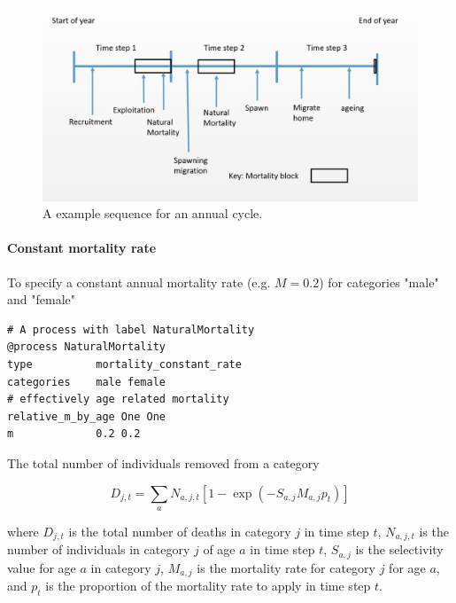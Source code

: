 \begin{figure}[H]
	\centering
	\includegraphics[scale=0.5]{Figures/annual_cycle.jpg}
	\caption{A example sequence for an annual cycle.}\label{Fig:annual2}
\end{figure}



\paragraph{Constant mortality rate}\label{sec:Process-MortalityConstantRate} 

To specify a constant annual mortality rate (e.g. $M=0.2$) for categories "male" and "female"

{\small{\begin{verbatim}
# A process with label NaturalMortality
@process NaturalMortality
type          mortality_constant_rate
categories    male female
# effectively age related mortality
relative_m_by_age One One
m             0.2 0.2
\end{verbatim}}}

The total number of individuals removed from a category

\begin{equation}
D_{j,t} = \sum_a N_{a,j,t} [1 - \exp(-S_{a,j} M_{a,j} p_t)]
\end{equation}

where $D_{j,t}$ is the total number of deaths in category $j$ in time step $t$, $N_{a,j,t}$ is the number of individuals in category $j$ of age $a$ in time step $t$, $S_{a,j}$ is the selectivity value for age $a$ in category $j$, $M_{a,j}$ is the mortality rate for category $j$ for age $a$, and $p_t$ is the proportion of the mortality rate to apply in time step $t$.

